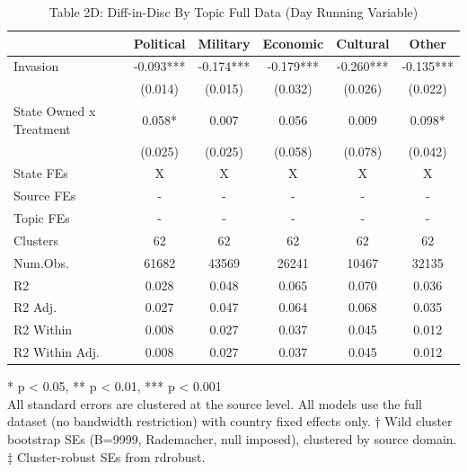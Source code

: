 \begin{table}[!t]
\caption{Table 2D: Diff-in-Disc By Topic Full Data (Day Running Variable)} 
\fontsize{12.0pt}{14.4pt}\selectfont
\begin{tabular*}{\linewidth}{@{\extracolsep{\fill}}lccccc}
\toprule
  & Political & Military & Economic & Cultural & Other \\ 
\midrule\addlinespace[2.5pt]
Invasion & -0.093*** & -0.174*** & -0.179*** & -0.260*** & -0.135*** \\ 
 & (0.014) & (0.015) & (0.032) & (0.026) & (0.022) \\ 
State Owned x Treatment & 0.058* & 0.007 & 0.056 & 0.009 & 0.098* \\ 
{} & {(0.025)} & {(0.025)} & {(0.058)} & {(0.078)} & {(0.042)} \\ 
State FEs & X & X & X & X & X \\ 
Source FEs & - & - & - & - & - \\ 
Topic FEs & - & - & - & - & - \\ 
Clusters & 62 & 62 & 62 & 62 & 62 \\ 
Num.Obs. & 61682 & 43569 & 26241 & 10467 & 32135 \\ 
R2 & 0.028 & 0.048 & 0.065 & 0.070 & 0.036 \\ 
R2 Adj. & 0.027 & 0.047 & 0.064 & 0.068 & 0.035 \\ 
R2 Within & 0.008 & 0.027 & 0.037 & 0.045 & 0.012 \\ 
R2 Within Adj. & 0.008 & 0.027 & 0.037 & 0.045 & 0.012 \\ 
\bottomrule
\end{tabular*}
\begin{minipage}{\linewidth}
* p < 0.05, ** p < 0.01, *** p < 0.001\\
All standard errors are clustered at the source level. All models use the full
dataset (no bandwidth restriction) with country fixed effects only. † Wild
cluster bootstrap SEs (B=9999, Rademacher, null imposed), clustered by source
domain. ‡ Cluster-robust SEs from rdrobust.\\
\end{minipage}
\end{table}

